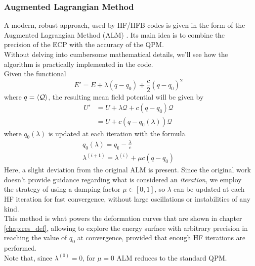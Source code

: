 \subsubsection{Augmented Lagrangian Method}
A modern, robust approach, used by HF/HFB codes \cite{RYSSENS2015175,CHEN2022108344} is given in the form of the Augmented Lagrangian Method (ALM) \cite{Staszczak2010}.
Its main idea is to combine the precision of the ECP with the accuracy of the QPM.
\\Without delving into cumbersome mathematical details, we'll see how the algorithm is practically implemented in the code.
\\Given the functional
\begin{equation}
    \label{eq:alm_lagrangian}
    E' = E + \lambda (q-q_0) + \frac c 2 (q-q_0)^2
\end{equation}
where $q = \expval{{\mathcal Q}}$, the resulting mean field potential will be given by
\begin{align}
    U' &= U + \lambda  {\mathcal Q} + c(q-q_0) {\mathcal Q} 
    \\ &= U + c(q-q_0(\lambda)) {\mathcal Q}
\end{align}
where $q_0(\lambda)$ is updated at each iteration with the formula
\begin{align}
    \label{eq:alm_q0}
    q_0(\lambda) = q_0 - \frac{\lambda}{c}
    \\\lambda ^{(i+1)} = \lambda^{(i)}+\mu c(q-q_0)
\end{align}
Here, a slight deviation from the original ALM is present. Since the original work \cite{Staszczak2010} doesn't provide guidance regarding what is considered an \textit{iteration}, we employ the strategy \cite{CHEN2022108344} of using a damping factor $\mu\in [0, 1]$, so $\lambda$ can be updated at each HF iteration for fast convergence, without large oscillations or instabilities of any kind.
\\This method is what powers the deformation curves that are shown in chapter \ref{chap:res_def}, allowing to explore the energy surface with arbitrary precision in reaching the value of $q_0$ at convergence, provided that enough HF iterations are performed.
\\Note that, since $\lambda^{(0)}=0$, for $\mu=0$ ALM reduces to the standard QPM.

